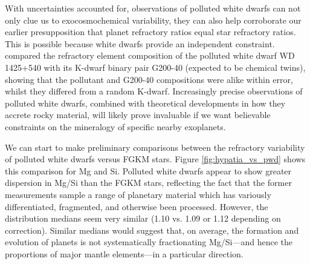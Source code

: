 With uncertainties accounted for, observations of polluted white dwarfs can not only clue us to exocosmochemical variability, they can also help corroborate our earlier presupposition that planet refractory ratios equal star refractory ratios. This is possible because white dwarfs provide an independent constraint. \citet{bonsor_hoststar_2021} compared the refractory element composition of the polluted white dwarf WD 1425+540 with its K-dwarf binary pair G200-40 (expected to be chemical twins), showing that the pollutant and G200-40 compositions were alike within error, whilst they differed from a random K-dwarf. Increasingly precise observations of polluted white dwarfs, combined with theoretical developments in how they accrete rocky material, will likely prove invaluable if we want believable constraints on the mineralogy of specific nearby exoplanets.

We can start to make preliminary comparisons between the refractory variability of polluted white dwarfs versus FGKM stars. Figure \ref{fig:hypatia_vs_pwd} shows this comparison for Mg and Si. Polluted white dwarfs appear to show greater dispersion in Mg/Si than the FGKM stars, reflecting the fact that the former measurements sample a range of planetary material which has variously differentiated, fragmented, and otherwise been processed. However, the distribution medians seem very similar (1.10 vs. 1.09 or 1.12 depending on correction). Similar medians would suggest that, on average, the formation and evolution of planets is not systematically fractionating Mg/Si---and hence the proportions of major mantle elements---in a particular direction.







